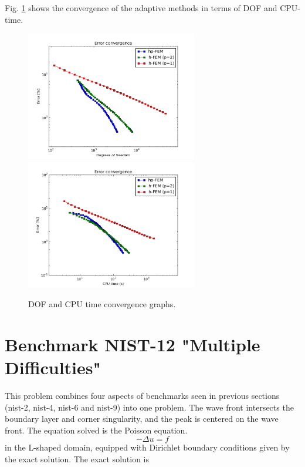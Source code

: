 \documentclass[12pt]{elsarticle}
\begin{document}
Fig. \ref{fig:nist-11-conv} shows the convergence of the adaptive methods in terms of DOF and CPU-time.

\begin{figure}[H]
\centering
\hspace{-50mm}
\includegraphics[width=7.5cm]{nist/nist-11/conv_dof_aniso.png}\ \
\hspace{-10mm}
\includegraphics[width=7.5cm]{nist/nist-11/conv_cpu_aniso.png}
\hspace{-50mm}
\caption{DOF and CPU time convergence graphs.}
\label{fig:nist-11-conv}
\end{figure}


\section{Benchmark NIST-12 "Multiple Difficulties"}
\label{sec:bench-12}

This problem combines four aspects of benchmarks
seen in previous sections (nist-2, nist-4, nist-6 and nist-9) into one problem.
The wave front intersects the boundary
layer and corner singularity, and the peak is centered on the wave front.
The equation solved is the Poisson equation.
\vspace{-3mm}
\begin{equation} \label{multiple}
-\Delta u = f
\end{equation}
in the L-shaped domain, equipped with Dirichlet boundary conditions
given by the exact solution.
The exact solution is
\end{document}
